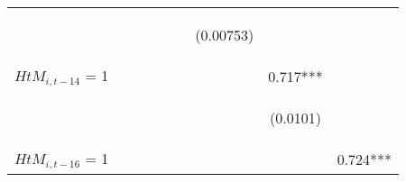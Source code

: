 \begin{center}
\begin{tabular}{lcccccccc}
\vspace{4pt} & \begin{footnotesize}\end{footnotesize} & \begin{footnotesize}\end{footnotesize} & \begin{footnotesize}\end{footnotesize} & \begin{footnotesize}\end{footnotesize} & \begin{footnotesize}\end{footnotesize} & \begin{footnotesize}(0.00753)\end{footnotesize} & \begin{footnotesize}\end{footnotesize} & \begin{footnotesize}\end{footnotesize} \\
$ {HtM}_{i, t-14} $ = 1 &  &  &  &  &  &  & 0.717*** &  \\
\vspace{4pt} & \begin{footnotesize}\end{footnotesize} & \begin{footnotesize}\end{footnotesize} & \begin{footnotesize}\end{footnotesize} & \begin{footnotesize}\end{footnotesize} & \begin{footnotesize}\end{footnotesize} & \begin{footnotesize}\end{footnotesize} & \begin{footnotesize}(0.0101)\end{footnotesize} & \begin{footnotesize}\end{footnotesize} \\
$ {HtM}_{i, t-16} $ = 1 &  &  &  &  &  &  &  & 0.724*** \\

\end{tabular}
\end{center}
